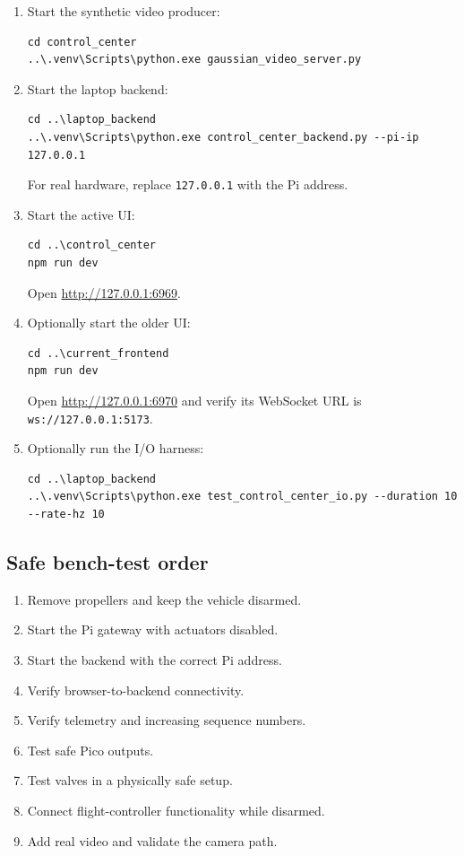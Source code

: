 \documentclass[11pt]{article}
\begin{document}
\begin{enumerate}
\item Start the synthetic video producer:
\begin{lstlisting}
cd control_center
..\.venv\Scripts\python.exe gaussian_video_server.py
\end{lstlisting}

\item Start the laptop backend:
\begin{lstlisting}
cd ..\laptop_backend
..\.venv\Scripts\python.exe control_center_backend.py --pi-ip 127.0.0.1
\end{lstlisting}
For real hardware, replace \texttt{127.0.0.1} with the Pi address.

\item Start the active UI:
\begin{lstlisting}
cd ..\control_center
npm run dev
\end{lstlisting}
Open \url{http://127.0.0.1:6969}.

\item Optionally start the older UI:
\begin{lstlisting}
cd ..\current_frontend
npm run dev
\end{lstlisting}
Open \url{http://127.0.0.1:6970} and verify its WebSocket URL is
\texttt{ws://127.0.0.1:5173}.

\item Optionally run the I/O harness:
\begin{lstlisting}
cd ..\laptop_backend
..\.venv\Scripts\python.exe test_control_center_io.py --duration 10 --rate-hz 10
\end{lstlisting}
\end{enumerate}

\subsection{Safe bench-test order}

\begin{enumerate}
\item Remove propellers and keep the vehicle disarmed.
\item Start the Pi gateway with actuators disabled.
\item Start the backend with the correct Pi address.
\item Verify browser-to-backend connectivity.
\item Verify telemetry and increasing sequence numbers.
\item Test safe Pico outputs.
\item Test valves in a physically safe setup.
\item Connect flight-controller functionality while disarmed.
\item Add real video and validate the camera path.
\end{enumerate}
\end{document}
